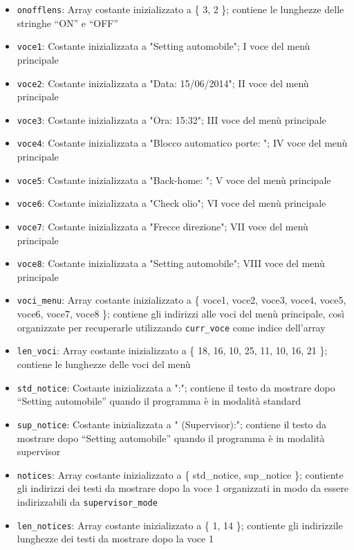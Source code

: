 \documentclass[
  12pt,
  a4paper,
  headings=optiontoheadandtoc
]{scrreprt}
\begin{document}
\begin{itemize}
\begin{itemize}
    \item \texttt{onofflens}: Array costante inizializzato a \{ 3, 2 \}; contiene le lunghezze delle stringhe ``ON'' e ``OFF''
    \item \texttt{voce1}: Costante inizializzata a "Setting automobile"; I voce del menù principale
    \item \texttt{voce2}: Costante inizializzata a "Data: 15/06/2014"; II voce del menù principale
    \item \texttt{voce3}: Costante inizializzata a "Ora: 15:32"; III voce del menù principale
    \item \texttt{voce4}: Costante inizializzata a "Blocco automatico porte: "; IV voce del menù principale
    \item \texttt{voce5}: Costante inizializzata a "Back-home: "; V voce del menù principale
    \item \texttt{voce6}: Costante inizializzata a "Check olio"; VI voce del menù principale
    \item \texttt{voce7}: Costante inizializzata a "Frecce direzione"; VII voce del menù principale
    \item \texttt{voce8}: Costante inizializzata a "Setting automobile"; VIII voce del menù principale
    \item \texttt{voci\_menu}: Array costante inizializzato a \{ voce1, voce2, voce3, voce4, voce5, voce6, voce7, voce8 \}; contiene gli indirizzi alle voci del menù principale, così organizzate per recuperarle utilizzando \texttt{curr\_voce} come indice dell'array
    \item \texttt{len\_voci}: Array costante inizializzato a \{ 18, 16, 10, 25, 11, 10, 16, 21 \}; contiene le lunghezze delle voci del menù
    \item \texttt{std\_notice}: Costante inizializzata a ":"; contiene il testo da mostrare dopo ``Setting automobile'' quando il programma è in modalità standard
    \item \texttt{sup\_notice}: Costante inizializzata a " (Supervisor):"; contiene il testo da mostrare dopo ``Setting automobile'' quando il programma è in modalità supervisor
    \item \texttt{notices}: Array costante inizializzato a \{ std\_notice, sup\_notice \}; contiente gli indirizzi dei testi da mostrare dopo la voce 1 organizzati in modo da essere indirizzabili da \texttt{supervisor\_mode}
    \item \texttt{len\_notices}: Array costante inizializzato a \{ 1, 14 \}; contiente gli indirizzile lunghezze dei testi da mostrare dopo la voce 1

\end{itemize}
\end{itemize}
\end{document}
